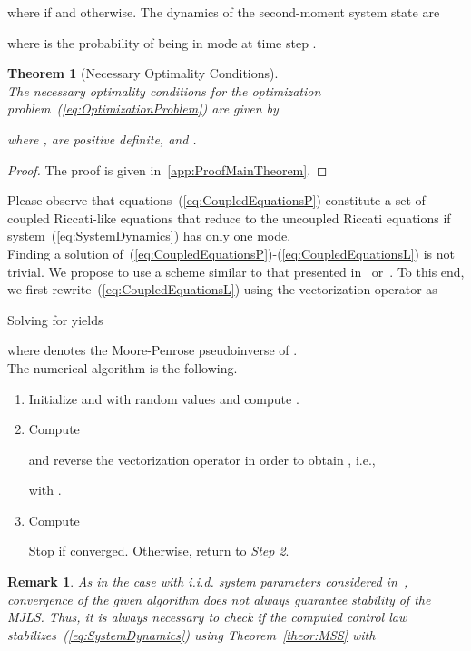 \documentclass[preprint,1p,11pt]{IR-Template/ISAS_IR}
\newtheorem{theorem}{Theorem}
\newtheorem{remark}{Remark}
\newtheorem{proof}{Proof}
\begin{document}
where  if  and  otherwise. The dynamics of the second-moment system state are

where  is the probability of being in mode  at time step .
\begin{theorem}[Necessary Optimality Conditions]\hfill\\
The necessary optimality conditions for the optimization problem~(\ref{eq:OptimizationProblem}) are given by

where ,  are positive definite, and .
\label{theor:Main}
\end{theorem}
\begin{proof}
The proof is given in~\ref{app:ProofMainTheorem}.
\end{proof}

Please observe that equations~(\ref{eq:CoupledEquationsP}) constitute a set of coupled Riccati-like equations that reduce to the uncoupled Riccati equations if system~(\ref{eq:SystemDynamics}) has only one mode.\\

Finding a solution of~(\ref{eq:CoupledEquationsP})-(\ref{eq:CoupledEquationsL}) is not trivial. We propose to use a scheme similar to that presented in~\cite{DeKoning_1992} or~\cite{Bernstein_1987}. To this end, we first rewrite~(\ref{eq:CoupledEquationsL}) using the vectorization operator as

Solving for  yields

where  denotes the Moore-Penrose pseudoinverse of .\\

The numerical algorithm is the following.\\

\begin{enumerate}[leftmargin = 1.4cm,rightmargin = 1cm,label= \hspace{1cm}\emph{Step \arabic*}:]
\item Initialize  and  with random values and compute .

\item Compute

and reverse the vectorization operator in order to obtain , i.e.,

with .

\item Compute

Stop if  converged. Otherwise, return to \emph{Step 2}.
\end{enumerate}

\begin{remark}
As in the case with i.i.d. system parameters considered in~\cite{DeKoning_1992}, convergence of the given algorithm does not always guarantee stability of the MJLS. Thus, it is always necessary to check if the computed control law stabilizes~(\ref{eq:SystemDynamics}) using Theorem~\ref{theor:MSS} with

\end{remark}
\end{document}
